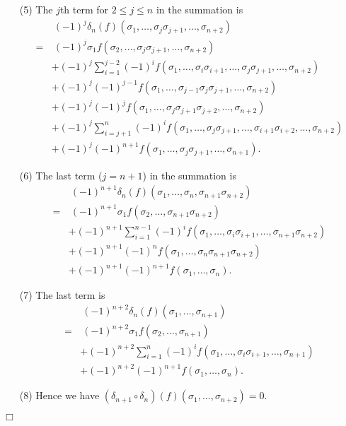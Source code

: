 \documentclass{article}
\begin{document}
\begin{enumerate}
\item[(5)]
  The $j$th term for $2 \leq j \leq n$ in the summation is
  \begin{align*}
    & \:
    (-1)^j \delta_n(f)(\sigma_1, \ldots, \sigma_j \sigma_{j+1}, \ldots, \sigma_{n+2}) \\
    = &\:
    (-1)^j \sigma_1 f(\sigma_2, \ldots, \sigma_j \sigma_{j+1}, \ldots, \sigma_{n+2}) \\
    & + (-1)^j \sum_{i=1}^{j-2} (-1)^{i}
        f(\sigma_1, \ldots, \sigma_i \sigma_{i+1}, \ldots,
            \sigma_j \sigma_{j+1}, \ldots, \sigma_{n+2}) \\
    & + (-1)^j (-1)^{j-1}
        f(\sigma_1, \ldots, \sigma_{j-1} \sigma_j \sigma_{j+1}, \ldots, \sigma_{n+2}) \\
    & + (-1)^j (-1)^{j}
        f(\sigma_1, \ldots, \sigma_j \sigma_{j+1} \sigma_{j+2}, \ldots, \sigma_{n+2}) \\
    & + (-1)^j \sum_{i=j+1}^{n} (-1)^{i}
        f(\sigma_1, \ldots, \sigma_j \sigma_{j+1}, \ldots,
            \sigma_{i+1} \sigma_{i+2}, \ldots, \sigma_{n+2}) \\
    & + (-1)^j (-1)^{n+1} f(\sigma_1, \ldots, \sigma_j \sigma_{j+1}, \ldots, \sigma_{n+1}).
  \end{align*}

\item[(6)]
  The last term ($j = n+1$) in the summation is
  \begin{align*}
    & \:
    (-1)^{n+1} \delta_n(f)(\sigma_1, \ldots, \sigma_n, \sigma_{n+1}\sigma_{n+2}) \\
    = & \:
    (-1)^{n+1} \sigma_1 f(\sigma_2, \ldots, \sigma_{n+1}\sigma_{n+2}) \\
    & + (-1)^{n+1} \sum_{i=1}^{n-1} (-1)^{i}
        f(\sigma_1, \ldots, \sigma_i \sigma_{i+1}, \ldots, \sigma_{n+1}\sigma_{n+2}) \\
    & + (-1)^{n+1} (-1)^n f(\sigma_1, \ldots, \sigma_{n}\sigma_{n+1}\sigma_{n+2}) \\
    & + (-1)^{n+1} (-1)^{n+1} f(\sigma_1, \ldots, \sigma_{n}).
  \end{align*}

\item[(7)]
  The last term is
  \begin{align*}
    & \:
    (-1)^{n+2} \delta_n(f)(\sigma_1, \ldots, \sigma_{n+1}) \\
    = & \:
    (-1)^{n+2} \sigma_1 f(\sigma_2, \ldots, \sigma_{n+1}) \\
    & + (-1)^{n+2} \sum_{i=1}^{n} (-1)^{i}
        f(\sigma_1, \ldots, \sigma_i \sigma_{i+1}, \ldots, \sigma_{n+1}) \\
    & + (-1)^{n+2} (-1)^{n+1} f(\sigma_1, \ldots, \sigma_{n}).
  \end{align*}

\item[(8)]
  Hence we have
  $(\delta_{n+1} \circ \delta_n)(f)(\sigma_1,\ldots,\sigma_{n+2}) = 0$.
\end{enumerate}
$\Box$ \\
\end{document}
